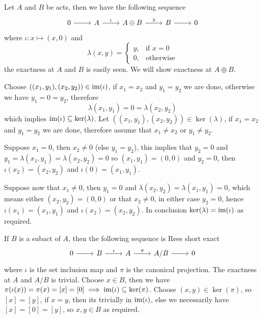 \begin{example}
    Let $A$ and $B$ be acts, then we have the following sequence
    \[\begin{tikzcd}
        0 & A & {A\oplus B} & B & 0
        \arrow[from=1-1, to=1-2]
        \arrow["\iota", from=1-2, to=1-3]
        \arrow["\lambda", from=1-3, to=1-4]
        \arrow[from=1-4, to=1-5]
    \end{tikzcd}\]
    where $\iota: x \mapsto (x,0)$ and 
    \[
        \lambda(x,y) = 
        \begin{cases}
            y, & \text{if } x=0 \\
            0, & \text{otherwise}
        \end{cases}
    \]
    the exactness at $A$ and $B$ is easily seen. We will show exactness 
    at $A\oplus B$.\par
    Choose $((x_1,y_1),(x_2,y_2))\in\text{im}(\iota)$, if $x_1=x_2$ and $y_1=y_2$ we are done, 
    otherwise we have $y_1=0=y_2$, therefore 
    \[
        \lambda(x_1,y_1)=0=\lambda(x_2,y_2)
    \]
    which implies $\text{im}(\iota)\subseteq\ker(\lambda)$.
    Let $((x_1,y_1),(x_2,y_2))\in\ker(\lambda)$, if $x_1=x_2$ and $y_1=y_2$
    we are done, therefore assume that $x_1\neq x_2$ or $y_1\neq y_2$.\par
    Suppose $x_1=0$, then $x_2\neq 0$ (else $y_1=y_2$), this implies
    that $y_2=0$ and $y_1=\lambda(x_1,y_1)=\lambda(x_2,y_2)=0$
    so $(x_1,y_1)=(0,0)$ and $y_2=0$, then 
    $\iota(x_2)=(x_2,y_2)$ and $\iota(0)=(x_1,y_1)$.\par
    Suppose now that $x_1\neq 0$, then $y_1=0$ and 
    $\lambda(x_2,y_2)=\lambda(x_1,y_1)=0$, which means either 
    $(x_2,y_2)=(0,0)$ or that $x_2\neq 0$, in either case $y_2=0$,
    hence $\iota(x_1)=(x_1,y_1)$ and $\iota(x_2)=(x_2,y_2)$.
    In conclusion $\ker(\lambda)=\text{im}(\iota)$ as required.
\end{example}
\begin{example}
    If $B$ is a subact of $A$, then the following sequence is Rees short exact 
    \[\begin{tikzcd}
        0 & B & A & {A/B} & 0
        \arrow[from=1-1, to=1-2]
        \arrow["\iota", from=1-2, to=1-3]
        \arrow["\pi", from=1-3, to=1-4]
        \arrow[from=1-4, to=1-5]
    \end{tikzcd}\]
    where $\iota$ is the set inclusion map and $\pi$ is the canonical projection. 
    The exactness at $A$ and $A/B$ is trivial. Choose $x\in B$, then we have 
    $\pi(\iota(x)) = \pi(x) = [x] = [0] \implies \text{im}(\iota)\subseteq\ker(\pi)$. Choose 
    $(x,y)\in\ker(\pi)$, so $[x]=[y]$, if $x=y$, then its trivially in $\text{im}(\iota)$, else 
    we necessarily have $[x]=[0]=[y]$, so $x,y\in B$ as required.
\end{example}
